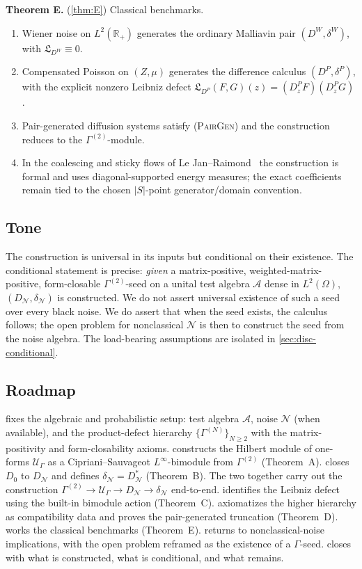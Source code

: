 \documentclass[11pt,reqno]{amsart}
\theoremstyle{plain}
\theoremstyle{definition}
\theoremstyle{remark}
\newcommand{\R}{\mathbb{R}}
\newcommand{\cA}{\mathcal A}
\newcommand{\cN}{\mathcal N}
\newcommand{\cU}{\mathcal U}
\newcommand{\dN}{D_{\cN}}
\newcommand{\divN}{\delta_{\cN}}
\newcommand{\Lleib}{\mathfrak L}
\begin{document}
\textbf{Theorem E.} (\cref{thm:E}) Classical benchmarks.
\begin{enumerate}
\item[$(\mathrm i)$] Wiener noise on $L^{2}(\R_{+})$ generates the
ordinary Malliavin pair $(D^{W},\delta^{W})$, with
$\Lleib_{D^{W}}\equiv 0$.
\item[$(\mathrm{ii})$] Compensated Poisson on $(Z,\mu)$ generates
the difference calculus $(D^{P},\delta^{P})$, with the explicit
nonzero Leibniz defect $\Lleib_{D^{P}}(F,G)(z)=(D^{P}_{z}F)(D^{P}_{z}G)$.
\item[$(\mathrm{iii})$] Pair-generated diffusion systems satisfy
\textsc{(PairGen)} and the construction reduces to the
$\Gamma^{(2)}$-module.
\item[$(\mathrm{iv})$] In the coalescing and sticky flows of Le
Jan--Raimond~\cite{LeJanRaimond2004} the construction is formal
and uses diagonal-supported energy measures; the exact
coefficients remain tied to the chosen $|S|$-point
generator/domain convention.
\end{enumerate}

\subsection{Tone}\label{sec:intro-tone}

The construction is universal in its inputs but conditional on
their existence. The conditional statement is precise:
\emph{given} a matrix-positive, weighted-matrix-positive, form-closable $\Gamma^{(2)}$-seed
on a unital test algebra $\cA$ dense in $L^{2}(\Omega)$,
$(\dN,\divN)$ is constructed. We do not assert universal
existence of such a seed over every black noise. We do assert
that when the seed exists, the calculus follows; the open
problem for nonclassical $\cN$ is then to construct the seed
from the noise algebra. The load-bearing assumptions are
isolated in \cref{sec:disc-conditional}.

\subsection{Roadmap}\label{sec:intro-roadmap}

 fixes the algebraic and probabilistic setup:
test algebra $\cA$, noise $\cN$ (when available), and the
product-defect hierarchy $\{\Gamma^{(N)}\}_{N\ge 2}$ with the
matrix-positivity and form-closability axioms.
 constructs the Hilbert module of one-forms
$\cU_{\Gamma}$ as a Cipriani--Sauvageot $L^{\infty}$-bimodule
from $\Gamma^{(2)}$ (Theorem~A).  closes
$D_{0}$ to $\dN$ and defines $\divN=\dN^{*}$ (Theorem~B). The
two together carry out the construction
$\Gamma^{(2)}\to\cU_{\Gamma}\to\dN\to\divN$ end-to-end.
 identifies the Leibniz defect using the
built-in bimodule action (Theorem~C). 
axiomatizes the higher hierarchy as compatibility data and
proves the pair-generated truncation (Theorem~D).
 works the classical benchmarks
(Theorem~E).  returns to
nonclassical-noise implications, with the open problem reframed
as the existence of a $\Gamma$-seed. 
closes with what is constructed, what is conditional, and what
remains.
\end{document}
